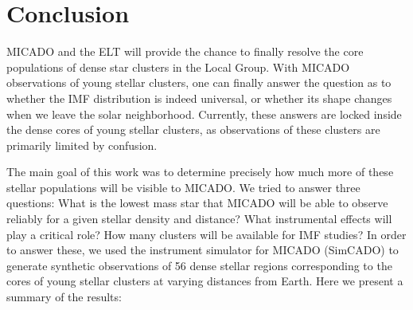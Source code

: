 \section{Conclusion}
\label{sec:conclusion}

MICADO and the ELT will provide the chance to finally resolve the core populations of dense star clusters in the Local Group.
With MICADO observations of young stellar clusters, one can finally answer the question as to whether the IMF distribution is indeed universal, or whether its shape changes when we leave the solar neighborhood. 
Currently, these answers are locked inside the dense cores of young stellar clusters, as observations of these clusters are primarily limited by confusion.

The main goal of this work was to determine precisely how much more of these stellar populations will be visible to MICADO. We tried to answer three questions: What is the lowest mass star that MICADO will be able to observe reliably for a given stellar density and distance? What instrumental effects will play a critical role? How many clusters will be available for IMF studies? In order to answer these, we used the instrument simulator for MICADO (SimCADO) to generate synthetic observations of 56 dense stellar regions corresponding to the cores of young stellar clusters at varying distances from Earth. Here we present a summary of the results:

